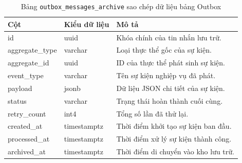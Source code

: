\begin{table}[H]
\centering
\begin{tabular}{|l|l|p{6cm}|}
\hline
\textbf{Cột} & \textbf{Kiểu dữ liệu} & \textbf{Mô tả} \\ \hline
id & uuid & Khóa chính của tin nhắn lưu trữ. \\ \hline
aggregate\_type & varchar & Loại thực thể gốc của sự kiện. \\ \hline
aggregate\_id & uuid & ID của thực thể phát sinh sự kiện. \\ \hline
event\_type & varchar & Tên sự kiện nghiệp vụ đã phát. \\ \hline
payload & jsonb & Dữ liệu JSON chi tiết của sự kiện. \\ \hline
status & varchar & Trạng thái hoàn thành cuối cùng. \\ \hline
retry\_count & int4 & Tổng số lần đã thử lại. \\ \hline
created\_at & timestamptz & Thời điểm khởi tạo sự kiện ban đầu. \\ \hline
processed\_at & timestamptz & Thời điểm xử lý sự kiện thành công. \\ \hline
archived\_at & timestamptz & Thời điểm di chuyển vào kho lưu trữ. \\ \hline
\end{tabular}
\caption{Bảng \texttt{outbox\_messages\_archive} sao chép dữ liệu bảng Outbox}
\end{table}
